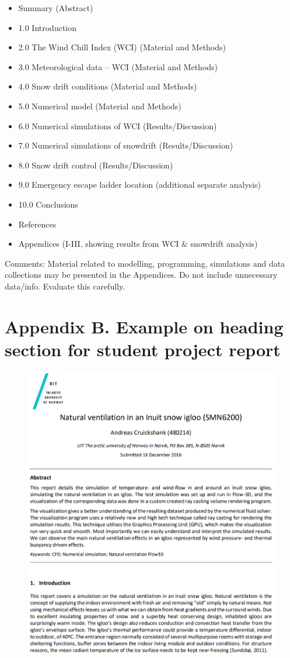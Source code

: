 \documentclass[a4paper,12pt]{extarticle}
\begin{document}
\begin{itemize}
  \item Summary (Abstract)
  \item 1.0 Introduction
  \item 2.0 The Wind Chill Index (WCI) (Material and Methods)
  \item 3.0 Meteorological data – WCI (Material and Methods)
  \item 4.0 Snow drift conditions (Material and Methods)
  \item 5.0 Numerical model (Material and Methods)
  \item 6.0 Numerical simulations of WCI (Results/Discussion)
  \item 7.0 Numerical simulations of snowdrift (Results/Discussion)
  \item 8.0 Snow drift control (Results/Discussion)
  \item 9.0 Emergency escape ladder location (additional separate analysis)
  \item 10.0 Conclusions
  \item References
  \item Appendices (I-III, showing results from WCI \& snowdrift analysis)
\end{itemize}

Comments: Material related to modelling, programming, simulations and data collections may be presented in the Appendices. Do not include unnecessary data/info. Evaluate this carefully.

\pagebreak
\appendix
\section{Appendix B. Example on heading section for student project report}

\begin{figure}[H]
  \centering
  \includegraphics[width=\textwidth]{ProjectExample.png}
\end{figure}
\end{document}

